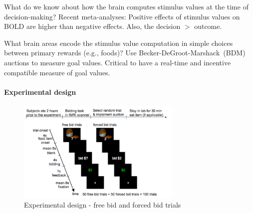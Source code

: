 \documentclass[12pt,article,oneside,a4paper]{memoir}
\begin{document}
What do we know about how the brain computes stimulus values at the time of
decision-making? Recent meta-analyses: Positive effects of stimulus values on
BOLD are higher than negative effects. Also, the decision $>$ outcome.

What brain areas encode the stimulus value computation in simple choices between
primary rewards (e.g., foods)? Use Becker-DeGroot-Marshack~(BDM) auctions to
measure goal values. Critical to have a real-time and incentive compatible
measure of goal values.

\paragraph{Experimental design}

\begin{figure}[h]
  \centering
  \includegraphics[width=0.7\textwidth]{imgs/experimental-design.png}
  \caption{Experimental design - free bid and forced bid trials}
  \label{fig:experimental-design}
\end{figure}
\end{document}
